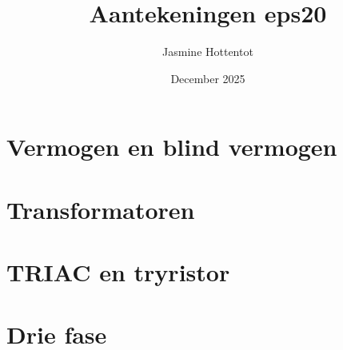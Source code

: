 \documentclass[14pt]{extarticle}
\title{Aantekeningen eps20}
\author{Jasmine Hottentot}
\date{December 2025}
\begin{document}
\maketitle
\newpage
\tableofcontents
\newpage
\section{Vermogen en blind vermogen}


\section{Transformatoren}

\section{TRIAC en tryristor}

\section{Drie fase}

\end{document}
